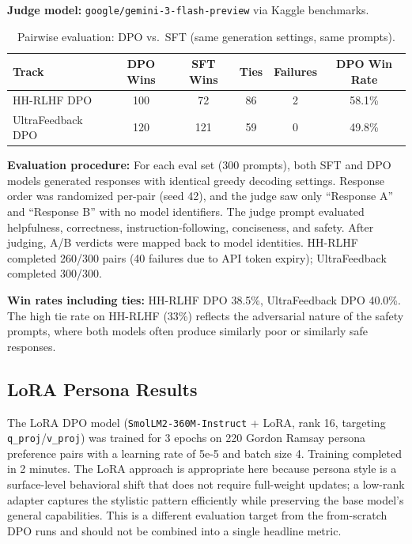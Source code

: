 \documentclass[11pt,a4paper]{article}
\begin{document}
\textbf{Judge model:} \texttt{google/gemini-3-flash-preview} via Kaggle benchmarks.

\begin{table}[H]
\centering
\caption{Pairwise evaluation: DPO vs.\ SFT (same generation settings, same prompts).}
\begin{tabular}{lccccc}
\toprule
\textbf{Track} & \textbf{DPO Wins} & \textbf{SFT Wins} & \textbf{Ties} & \textbf{Failures} & \textbf{DPO Win Rate} \\
\midrule
HH-RLHF DPO       & 100 & 72  & 86 & 2 & 58.1\% \\
UltraFeedback DPO  & 120 & 121 & 59 & 0 & 49.8\% \\
\bottomrule
\end{tabular}
\end{table}

\textbf{Evaluation procedure:} For each eval set (300 prompts), both SFT and DPO models generated responses with identical greedy decoding settings. Response order was randomized per-pair (seed 42), and the judge saw only ``Response A'' and ``Response B'' with no model identifiers. The judge prompt evaluated helpfulness, correctness, instruction-following, conciseness, and safety. After judging, A/B verdicts were mapped back to model identities. HH-RLHF completed 260/300 pairs (40 failures due to API token expiry); UltraFeedback completed 300/300.

\textbf{Win rates including ties:} HH-RLHF DPO 38.5\%, UltraFeedback DPO 40.0\%. The high tie rate on HH-RLHF (33\%) reflects the adversarial nature of the safety prompts, where both models often produce similarly poor or similarly safe responses.

\subsection{LoRA Persona Results}

The LoRA DPO model (\texttt{SmolLM2-360M-Instruct} + LoRA, rank 16, targeting \texttt{q\_proj}/\texttt{v\_proj}) was trained for 3 epochs on 220 Gordon Ramsay persona preference pairs with a learning rate of 5e-5 and batch size 4. Training completed in 2 minutes. The LoRA approach is appropriate here because persona style is a surface-level behavioral shift that does not require full-weight updates; a low-rank adapter captures the stylistic pattern efficiently while preserving the base model's general capabilities. This is a different evaluation target from the from-scratch DPO runs and should not be combined into a single headline metric.
\end{document}
